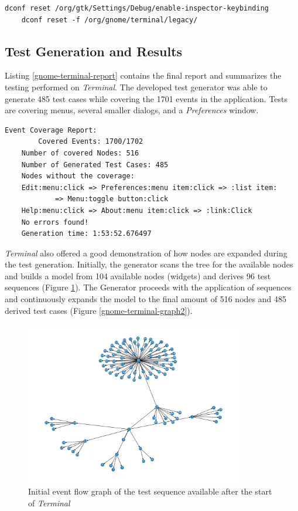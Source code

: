 \begin{lstlisting}[caption={Final test generator report},label={gnome-terminal-cleanup}]
    dconf reset /org/gtk/Settings/Debug/enable-inspector-keybinding
    dconf reset -f /org/gnome/terminal/legacy/
\end{lstlisting}

\subsection{Test Generation and Results}

Listing \ref{gnome-terminal-report} contains the final report and summarizes the testing performed on \textit{Terminal}. The developed test generator was able to generate 485 test cases while covering the 1701 events in the application. Tests are covering menus, several smaller dialogs, and a \textit{Preferences} window.

\begin{lstlisting}[caption={Final test generator report},label={gnome-terminal-report}]
    Event Coverage Report:
        Covered Events: 1700/1702
    Number of covered Nodes: 516
    Number of Generated Test Cases: 485 
    Nodes without the coverage:
    Edit:menu:click => Preferences:menu item:click => :list item: 
            => Menu:toggle button:click
    Help:menu:click => About:menu item:click => :link:Click
    No errors found!
    Generation time: 1:53:52.676497
\end{lstlisting}

\textit{Terminal} also offered a good demonstration of how nodes are expanded during the test generation. Initially, the generator scans the tree for the available nodes and builds a model from 104 available nodes (widgets) and derives 96 test sequences (Figure \ref{gnome-terminal-graph1}). The Generator proceeds with the application of sequences and continuously expands the model to the final amount of 516 nodes and 485 derived test cases (Figure \ref{gnome-terminal-graph2}).

\begin{figure}[H]
	\centering
	\includegraphics[width=0.85\textwidth,clip]{obrazky-figures/gnome-terminal_n_start.png}
	\caption{Initial event flow graph of the test sequence available after the start of \textit{Terminal}}
	\label{gnome-terminal-graph1}
\end{figure}

